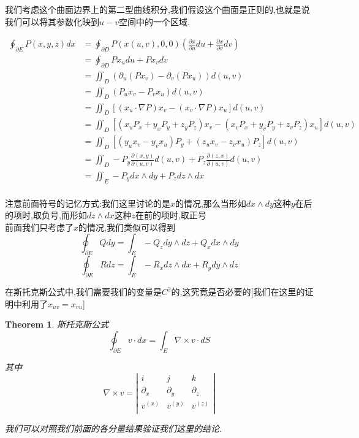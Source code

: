 \documentclass[11pt,hyperref,a4paper,UTF8]{ctexart}
\newtheorem{theorem}{Theorem}[subsection]
\newcommand{\parameter}[1]{\left(#1\right)}
\newcommand{\bracket}[1]{\left[#1\right]}
\begin{document}
\begin{CJK}{UTF8}{gkai}
我们考虑这个曲面边界上的第二型曲线积分,我们假设这个曲面是正则的,也就是说我们可以将其参数化映到$u-v$空间中的一个区域.

\[
\begin{aligned}  
  \oint_{\partial E}P(x,y,z) dx &= \oint_{\partial D} P(x(u,v),0,0) \parameter{\frac{\partial x}{\partial u} du + \frac{\partial x}{\partial v} dv}\\ 
  &= \oint_{\partial D} Px_u du + P x_v dv\\
  &= \iint_D \parameter{\partial_u(P x_v) - \partial_v(P x_u)}d(u,v)\\
  &= \iint_D \parameter{P_u x_v - P_v x_u}d(u,v)\\
  &= \iint_D \bracket{(x_u \cdot \nabla P) x_v - (x_v \cdot \nabla P)x_u} d(u,v)\\
  &= \iint_D \bracket{(x_u P_x + y_x P_y + z_y P_z)x_v - (x_v P_x + y_v P_y + z_v P_z)x_u} d(u,v)\\
  &= \iint_D \bracket{(y_u x_v - y_v x_u)P_y + (z_u x_v - z_v x_u)P_z} d(u,v)\\
  &= \iint_D - P_y \frac{\partial(x,y)}{\partial(u,v)}d(u,v) + P_z \frac{\partial(z,x)}{\partial(u,v)}d(u,v)\\
  &= \iint_E -P_y dx\wedge dy + P_z dz\wedge dx\\
\end{aligned}  
\]

注意前面符号的记忆方式:我们这里讨论的是$x$的情况,那么当形如$dx\wedge dy$这种$y$在后的项时,取负号,而形如$dz\wedge dx$这种$z$在前的项时,取正号\\

前面我们只考虑了$x$的情况,我们类似可以得到
\[\oint_{\partial E} Q dy = \int_E -Q_z dy \wedge dz + Q_x dx\wedge dy \]
\[\oint_{\partial E} R dz = \int_E -R_x dz \wedge dx + R_y dy\wedge dz \]

在斯托克斯公式中,我们需要我们的变量是$C^2$的,这究竟是否必要的[我们在这里的证明中利用了$x_{uv} = x_{vu}$]
\begin{theorem}
  斯托克斯公式
  \[\oint_{\partial E} v \cdot dx = \int_E \nabla \times v \cdot dS\]

  其中
  \[\nabla \times v = \left|\begin{matrix}
    i & j & k\\
    \partial_x & \partial_y & \partial_z\\
    v^{(x)} & v^{(y)} & v^{(z)}\\
  \end{matrix}\right|\]

  我们可以对照我们前面的各分量结果验证我们这里的结论.


\end{theorem}
\end{CJK}
\end{document}
